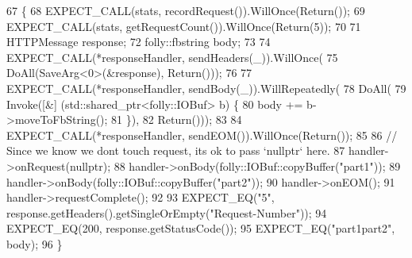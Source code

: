 \begin{DoxyCode}
67                                                 \{
68   EXPECT\_CALL(stats, recordRequest()).WillOnce(Return());
69   EXPECT\_CALL(stats, getRequestCount()).WillOnce(Return(5));
70 
71   HTTPMessage response;
72   folly::fbstring body;
73 
74   EXPECT\_CALL(*responseHandler, sendHeaders(\_)).WillOnce(
75       DoAll(SaveArg<0>(&response), Return()));
76 
77   EXPECT\_CALL(*responseHandler, sendBody(\_)).WillRepeatedly(
78       DoAll(
79           Invoke([&] (std::shared\_ptr<folly::IOBuf> b) \{
80             body += b->moveToFbString();
81           \}),
82           Return()));
83 
84   EXPECT\_CALL(*responseHandler, sendEOM()).WillOnce(Return());
85 
86   \textcolor{comment}{// Since we know we dont touch request, its ok to pass `nullptr` here.}
87   handler->onRequest(\textcolor{keyword}{nullptr});
88   handler->onBody(folly::IOBuf::copyBuffer(\textcolor{stringliteral}{"part1"}));
89   handler->onBody(folly::IOBuf::copyBuffer(\textcolor{stringliteral}{"part2"}));
90   handler->onEOM();
91   handler->requestComplete();
92 
93   EXPECT\_EQ(\textcolor{stringliteral}{"5"}, response.getHeaders().getSingleOrEmpty(\textcolor{stringliteral}{"Request-Number"}));
94   EXPECT\_EQ(200, response.getStatusCode());
95   EXPECT\_EQ(\textcolor{stringliteral}{"part1part2"}, body);
96 \}
\end{DoxyCode}
